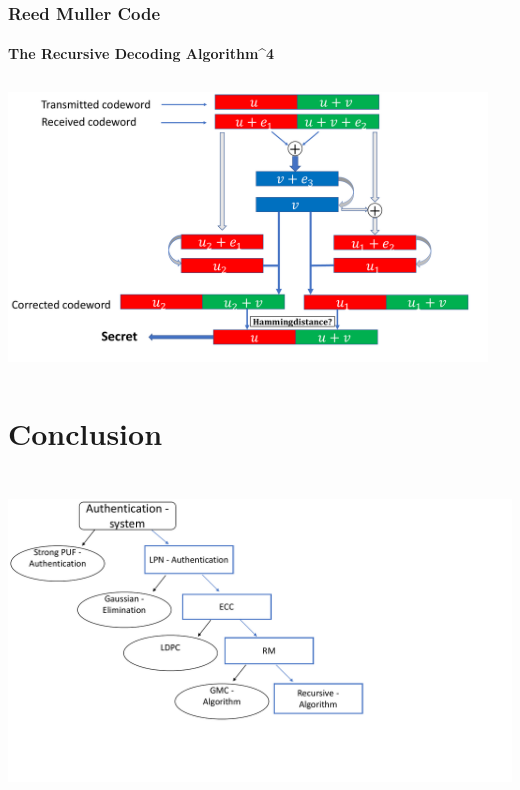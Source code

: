 \documentclass{beamer}
\begin{document}
\begin{frame}
	\frametitle{Reed Muller Code}
	\framesubtitle{The Recursive Decoding Algorithm^{4}}
	\includegraphics[width=5in,height=3in]{recursivedecoding-description.pdf}
\vspace{0.5cm}
\end{frame}


\section{Conclusion}
\begin{outlineframe}
	\tableofcontents[currentsection]
\end{outlineframe}
\begin{frame}
	\includegraphics[width=6.2in,height=3.5in]{conclusion.pdf}
\end{frame}	
\end{document}
